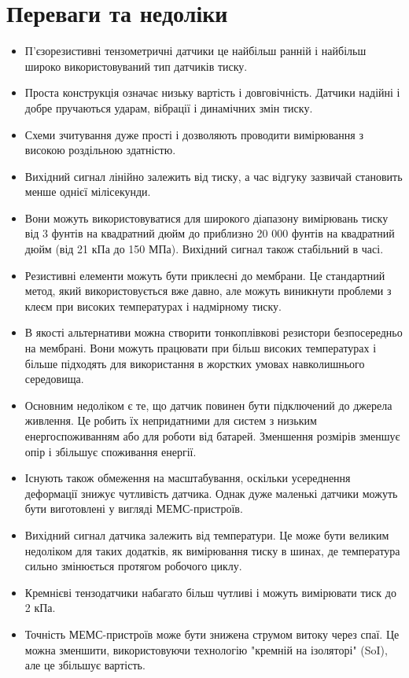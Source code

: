 \documentclass[a4paper,fontsize=12]{report}
\begin{document}
\section{Переваги та недоліки}
 { \begin{itemize}
  \item П'єзорезистивні тензометричні датчики
  це найбільш ранній і найбільш широко використовуваний тип датчиків тиску.

  \item Проста конструкція означає низьку вартість і довговічність. Датчики надійні і добре пручаються ударам, вібрації і динамічних змін тиску.

  \item Схеми зчитування дуже прості і дозволяють проводити вимірювання з високою роздільною здатністю.

  \item Вихідний сигнал лінійно залежить від тиску, а час відгуку зазвичай становить менше однієї мілісекунди.

  \item Вони можуть використовуватися для широкого діапазону вимірювань тиску від 3 фунтів на квадратний дюйм до приблизно 20 000 фунтів на квадратний дюйм (від 21 кПа до 150 МПа). Вихідний сигнал також стабільний в часі.

  \item Резистивні елементи можуть бути приклеєні до мембрани. Це стандартний метод, який використовується вже давно, але можуть виникнути проблеми з клеєм при високих температурах і надмірному тиску.

  \item В якості альтернативи можна створити тонкоплівкові резистори безпосередньо на мембрані. Вони можуть працювати при більш високих температурах і більше підходять для використання в жорстких умовах навколишнього середовища.

  \item Основним недоліком є те, що датчик повинен бути підключений до джерела живлення. Це робить їх непридатними для систем з низьким енергоспоживанням або для роботи від батарей. Зменшення розмірів зменшує опір і збільшує споживання енергії.

  \item Існують також обмеження на масштабування, оскільки усереднення деформації знижує чутливість датчика. Однак дуже маленькі датчики можуть бути виготовлені у вигляді МЕМС-пристроїв.

  \item Вихідний сигнал датчика залежить від температури. Це може бути великим недоліком для таких додатків, як вимірювання тиску в шинах, де температура сильно змінюється протягом робочого циклу.

  \item Кремнієві тензодатчики набагато більш чутливі і можуть вимірювати тиск до 2 кПа.

  \item Точність МЕМС-пристроїв може бути знижена струмом витоку через спаї. Це можна зменшити, використовуючи технологію "кремній на ізоляторі" (SoI), але це збільшує вартість.
  \end{itemize}}
\end{document}
